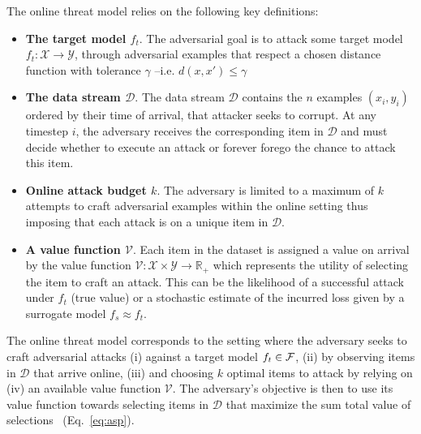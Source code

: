 \begin{ftheo}
The online threat model relies on the following key definitions:
\begin{itemize}[leftmargin=*, itemsep=1pt, topsep=1pt, parsep=1pt]
\item 
\textbf{The target model $f_t$}. The adversarial goal is to attack some target model $f_t : \mathcal{X} \rightarrow \mathcal{Y}$, through adversarial examples that respect a chosen distance function with tolerance $\gamma$ --i.e. $d(x,x') \leq \gamma$ 

\item
\textbf{The data stream $\mathcal{D}$}. The data stream $\mathcal{D}$ contains the $n$ examples $(x_i,y_i)$ ordered by their time of arrival, that attacker seeks to corrupt. At any timestep $i$, the adversary receives the corresponding item in $\mathcal{D}$ and must decide whether to execute an attack or forever forego the chance to attack this item.

\item
\textbf{Online attack budget $k$}. The adversary is limited to a maximum of $k$ attempts to craft adversarial examples within the online setting thus imposing that each attack is on a unique item in $\mathcal{D}$.

\item
\textbf{A value function $\mathcal{V}$}. Each item in the dataset is assigned a value on arrival by the value function $\mathcal{V}: \mathcal{X} \times \mathcal{Y} \rightarrow \mathbb{R}_+$ which represents the utility of selecting the item to craft an attack. This can be the likelihood of a successful attack under $f_t$ (true value) or a stochastic estimate of the incurred loss given by a surrogate model $f_s \approx f_t$.
\end{itemize}

The online threat model corresponds to the setting where the adversary seeks to craft adversarial attacks (i) against a target model $f_t \in {\mathcal{F}}$, (ii) by observing items in $\mathcal{D}$ that arrive online, (iii) and choosing $k$ optimal items to attack by relying on (iv) an available value function $\mathcal{V}$. The adversary's objective is then to use its value function towards selecting items in $\mathcal{D}$ that maximize the sum total value of selections \setvalue\ (Eq.~\ref{eq:asp}).
\end{ftheo}

